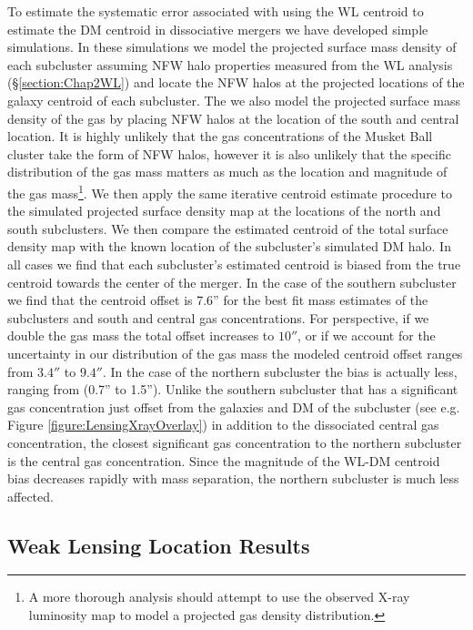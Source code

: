 To estimate the systematic error associated with using the WL centroid to estimate the DM centroid in dissociative mergers we have developed simple simulations.
In these simulations we model the projected surface mass density of each subcluster assuming NFW halo properties measured from the WL analysis (\S\ref{section:Chap2WL}) and locate the NFW halos at the projected locations of the galaxy centroid of each subcluster.
The we also model the projected surface mass density of the gas by placing NFW halos at the location of the south and central location.
It is highly unlikely that the gas concentrations of the Musket Ball cluster take the form of NFW halos, however it is also unlikely that the specific distribution of the gas mass matters as much as the location and magnitude of the gas mass\footnote{A more thorough analysis should attempt to use the observed X-ray luminosity map to model a projected gas density distribution.}.
We then apply the same iterative centroid estimate procedure to the simulated projected surface density map at the locations of the north and south subclusters.
We then compare the estimated centroid of the total surface density map with the known location of the subcluster's simulated DM halo.
In all cases we find that each subcluster's estimated centroid is biased from the true centroid towards the center of the merger.
In the case of the southern subcluster we find that the centroid offset is 7.6'' for the best fit mass estimates of the subclusters and south and central gas concentrations.
For perspective, if we double the gas mass the total offset increases to $10''$, or if we account for the uncertainty in our distribution of the gas mass the modeled centroid offset ranges from $3.4''$ to $9.4''$.
In the case of the northern subcluster the bias is actually less, ranging from (0.7'' to 1.5'').
Unlike the southern subcluster that has a significant gas concentration just offset from the galaxies and DM of the subcluster (see e.g. Figure \ref{figure:LensingXrayOverlay}) in addition to the dissociated central gas concentration, the closest significant gas concentration to the northern subcluster is the central gas concentration.
Since the magnitude of the WL-DM centroid bias decreases rapidly with mass separation, the northern subcluster is much less affected.

\subsection{Weak Lensing Location Results}

